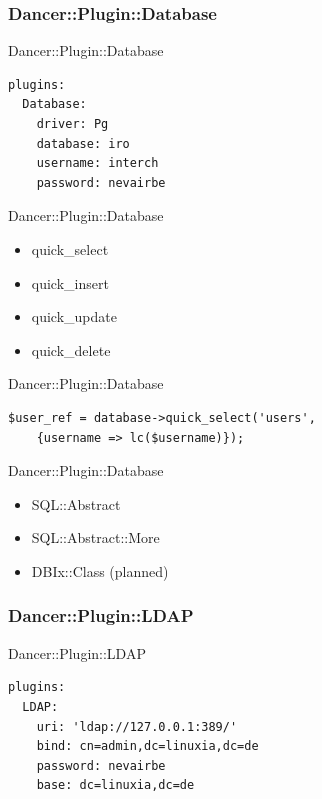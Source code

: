 \subsubsection{Dancer::Plugin::Database}
\begin{frame}[fragile]{Dancer::Plugin::Database}
\begin{lstlisting}
plugins:
  Database:
    driver: Pg
    database: iro
    username: interch
    password: nevairbe
\end{lstlisting}
\end{frame}

\begin{frame}[fragile]{Dancer::Plugin::Database}
\begin{itemize}
\item quick\_select
\item quick\_insert
\item quick\_update
\item quick\_delete
\end{itemize}
\end{frame} 

\begin{frame}[fragile]{Dancer::Plugin::Database}
\begin{lstlisting}
$user_ref = database->quick_select('users', 
    {username => lc($username)});
\end{lstlisting}
\end{frame}

\begin{frame}{Dancer::Plugin::Database}
\begin{itemize}
\item SQL::Abstract
\item SQL::Abstract::More
\item DBIx::Class (planned)
\end{itemize}
\end{frame}

\subsubsection{Dancer::Plugin::LDAP}

\begin{frame}[fragile]{Dancer::Plugin::LDAP}
\begin{lstlisting}
plugins:
  LDAP:
    uri: 'ldap://127.0.0.1:389/'
    bind: cn=admin,dc=linuxia,dc=de
    password: nevairbe
    base: dc=linuxia,dc=de
\end{lstlisting}
\end{frame}

